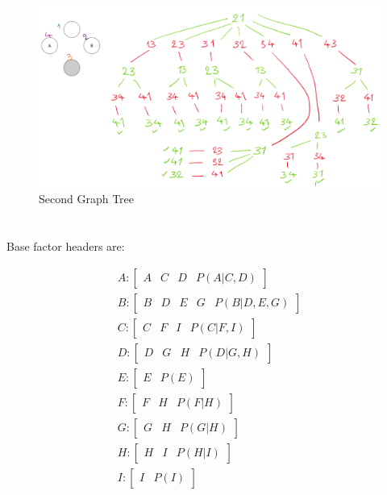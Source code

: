 \documentclass[en]{university}
\begin{document}
\begin{figure}[!htbp]
    \centering
    \includegraphics[width=\textwidth]{assets/1-b-2.png}
    \caption{Second Graph Tree}
    \label{fig:tree2}
\end{figure}

\section{}

Base factor headers are:

\begin{align*}
    A : \begin{bmatrix}
        A & C & D & P(A | C, D)
    \end{bmatrix} \\
    B : \begin{bmatrix}
        B & D & E & G & P(B | D, E, G)
    \end{bmatrix} \\
    C : \begin{bmatrix}
        C & F & I & P(C | F, I)
    \end{bmatrix} \\
    D : \begin{bmatrix}
        D & G & H & P(D | G, H)
    \end{bmatrix} \\
    E : \begin{bmatrix}
        E & P(E)
    \end{bmatrix} \\
    F : \begin{bmatrix}
        F & H & P(F | H)
    \end{bmatrix} \\
    G : \begin{bmatrix}
        G & H & P(G | H)
    \end{bmatrix} \\
    H : \begin{bmatrix}
        H & I & P(H | I)
    \end{bmatrix} \\
    I : \begin{bmatrix}
        I & P(I)
    \end{bmatrix}
\end{align*}
\end{document}
